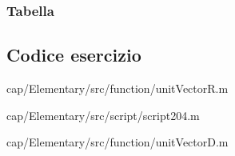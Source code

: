\subsubsection{Tabella}    

\newpage

\subsection{Codice esercizio}
%
{cap/Elementary/src/function/unitVectorR.m}

%
{cap/Elementary/src/script/script204.m}

%
{cap/Elementary/src/function/unitVectorD.m}
